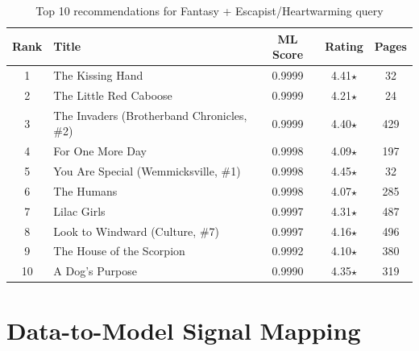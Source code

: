 \documentclass[12pt, a4paper]{article}
\begin{document}
\begin{table}[H]
\centering
\caption{Top 10 recommendations for Fantasy + Escapist/Heartwarming query}
\begin{tabular}{@{}clccc@{}}
\toprule
\textbf{Rank} & \textbf{Title} & \textbf{ML Score} & \textbf{Rating} & \textbf{Pages} \\
\midrule
1 & The Kissing Hand & 0.9999 & 4.41$\star$ & 32 \\
2 & The Little Red Caboose & 0.9999 & 4.21$\star$ & 24 \\
3 & The Invaders (Brotherband Chronicles, \#2) & 0.9999 & 4.40$\star$ & 429 \\
4 & For One More Day & 0.9998 & 4.09$\star$ & 197 \\
5 & You Are Special (Wemmicksville, \#1) & 0.9998 & 4.45$\star$ & 32 \\
6 & The Humans & 0.9998 & 4.07$\star$ & 285 \\
7 & Lilac Girls & 0.9997 & 4.31$\star$ & 487 \\
8 & Look to Windward (Culture, \#7) & 0.9997 & 4.16$\star$ & 496 \\
9 & The House of the Scorpion & 0.9992 & 4.10$\star$ & 380 \\
10 & A Dog's Purpose & 0.9990 & 4.35$\star$ & 319 \\
\bottomrule
\end{tabular}
\end{table}

\section{Data-to-Model Signal Mapping}
\end{document}
